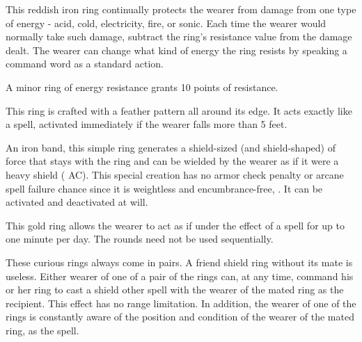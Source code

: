 
 This reddish iron ring continually protects the wearer from damage from one type of energy - acid, cold, electricity, fire, or sonic. Each time the wearer would normally take such damage, subtract the ring's resistance value from the damage dealt. The wearer can change what kind of energy the ring resists by speaking a command word as a standard action.

A minor ring of energy resistance grants 10 points of resistance.


 This ring is crafted with a feather pattern all around its edge. It acts exactly like a  spell, activated immediately if the wearer falls more than 5 feet.


 An iron band, this simple ring generates a shield-sized (and shield-shaped)  of force that stays with the ring and can be wielded by the wearer as if it were a heavy shield ( AC). This special creation has no armor check penalty or arcane spell failure chance since it is weightless and encumbrance-free, . It can be activated and deactivated at will.


 This gold ring allows the wearer to act as if under the effect of a  spell for up to one minute per day. The rounds need not be used sequentially.


 These curious rings always come in pairs. A friend shield ring without its mate is useless. Either wearer of one of a pair of the rings can, at any time, command his or her ring to cast a shield other spell with the wearer of the mated ring as the recipient. This effect has no range limitation. In addition, the wearer of one of the rings is constantly aware of the position and condition of the wearer of the mated ring, as the  spell.

